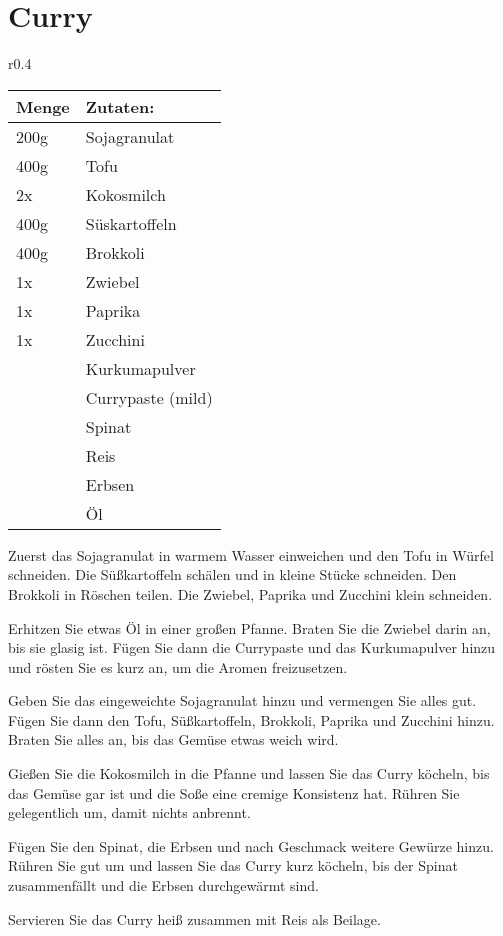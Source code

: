 \documentclass[../../book.tex]{subfiles}
\begin{document}
\section{Curry}
\begin{wraptable}{r}{0.4\textwidth}
  \centering
  \begin{tabularx}{0.39\textwidth}{|l|X|}
    \toprule
    Menge & Zutaten: \\
    \midrule
    200g & Sojagranulat \\
    \midrule
    400g & Tofu \\
    \midrule
    2x & Kokosmilch \\
    \midrule
    400g & S\"uskartoffeln \\
    \midrule
    400g & Brokkoli \\
    \midrule
    1x & Zwiebel \\
    \midrule
    1x & Paprika \\
    \midrule
    1x & Zucchini \\
    \midrule
    & Kurkumapulver \\
    \midrule
    & Currypaste (mild) \\
    \midrule
    & Spinat \\
    \midrule
    & Reis \\
    \midrule
    & Erbsen \\
    \midrule
    & Öl \\
    \bottomrule
  \end{tabularx}
\end{wraptable}
Zuerst das Sojagranulat in warmem Wasser einweichen und den Tofu in Würfel schneiden. Die Süßkartoffeln schälen und in kleine Stücke schneiden. Den Brokkoli in Röschen teilen. Die Zwiebel, Paprika und Zucchini klein schneiden.

Erhitzen Sie etwas Öl in einer großen Pfanne. Braten Sie die Zwiebel darin an, bis sie glasig ist. Fügen Sie dann die Currypaste und das Kurkumapulver hinzu und rösten Sie es kurz an, um die Aromen freizusetzen.

Geben Sie das eingeweichte Sojagranulat hinzu und vermengen Sie alles gut. Fügen Sie dann den Tofu, Süßkartoffeln, Brokkoli, Paprika und Zucchini hinzu. Braten Sie alles an, bis das Gemüse etwas weich wird.

Gießen Sie die Kokosmilch in die Pfanne und lassen Sie das Curry köcheln, bis das Gemüse gar ist und die Soße eine cremige Konsistenz hat. Rühren Sie gelegentlich um, damit nichts anbrennt.

Fügen Sie den Spinat, die Erbsen und nach Geschmack weitere Gewürze hinzu. Rühren Sie gut um und lassen Sie das Curry kurz köcheln, bis der Spinat zusammenfällt und die Erbsen durchgewärmt sind.

Servieren Sie das Curry heiß zusammen mit Reis als Beilage.
\newpage
\end{document}
